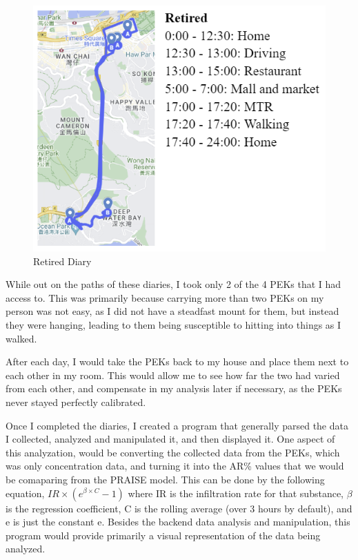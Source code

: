 \documentclass{article}
\begin{document}
\begin{multicols}{2}
\begin{figure}[H]
  \includegraphics[width=\linewidth]{Diary_Retired.png}
  \caption{\label{figure:DiaryRetired}Retired Diary}
\end{figure}

While out on the paths of these diaries, I took only 2 of the 4 PEKs that I had access to.
This was primarily because carrying more than two PEKs on my person was not easy, as I 
did not have a steadfast mount for them, but instead they were hanging, leading to them being
susceptible to hitting into things as I walked.

After each day, I would take the PEKs back to my house and place them next to each 
other in my room. This would allow me to see how far the two had varied from 
each other, and compensate in my analysis later if necessary, as the PEKs never 
stayed perfectly calibrated.

Once I completed the diaries, I created a program that generally parsed the data I collected, 
analyzed and manipulated it, and then displayed it. One aspect of this analyzation, would be
converting the collected data from the PEKs, which was only concentration data, and 
turning it into the AR\% values that we would be comaparing from the PRAISE model.
This can be done by the following equation, 
$IR \times (e^{\beta \times C} - 1)$
where IR is the infiltration rate for that substance, $\beta$ is the regression coefficient,
C is the rolling average (over 3 hours by default), and e is just the constant e.
Besides the backend data analysis and manipulation, 
this program would provide primarily a visual representation of the data being analyzed.



\end{multicols}
\end{document}

